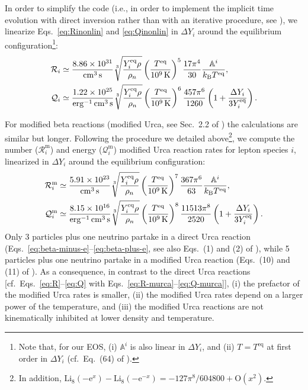 \documentclass[aps,prd,twocolumn,a4paper,floatfix,nofootbib,superscriptaddress,nofootinbib]{revtex4}
\newcommand{\req}{\mathrm{eq}}
\begin{document}
In order to simplify the code (i.e., in order to implement the implicit time evolution
with direct inversion rather than with an iterative procedure, see \citet{Camelio22code}), we linearize Eqs.~\eqref{eq:Rinonlin}
and \eqref{eq:Qinonlin} in $\Delta Y_i$ around the equilibrium configuration\footnote{Note that, for our EOS, (i) $\mathbb A^i$ is also
linear in $\Delta Y_i$, and (ii) $T=T^\req$ at first order in $\Delta Y_i$ (cf.~Eq.~(64) of \citet{Gavassino21bulk}).}:
%
\begin{align}
\label{eq:R}
\mathcal R_i\simeq{}& \frac{8.86\times 10^{31}}{\unit{cm^{3}\,s}}
\sqrt[3]{\frac{Y^\req_i\rho}{\rho_n}} \left(\frac{T^\req}{\unit[10^9]{K}}\right)^5
\frac{17\pi^4}{30}\frac{\mathbb A^i}{k_\mathrm{B}T^\req},\\
%
\label{eq:Q}
\mathcal Q_i\simeq{}& \frac{1.22\times10^{25}}{\unit{erg^{-1}\,cm^{3}\,s}}
\sqrt[3]{\frac{Y^\req_i\rho}{\rho_n}} \left(\frac{T^\req}{\unit[10^9]{K}}\right)^6\frac{457\pi^6}{1260}
\left(1 + \frac{\Delta Y_i}{3Y^\req_i}\right).
%
\end{align}

For modified beta reactions (modified Urca, see Sec.~2.2 of \citet{Haensel92}) the
calculations are similar but longer.
%
Following the procedure we detailed above\footnote{In addition,
$\mathrm{Li}_8(-\mathrm e^x)-\mathrm{Li}_8(-\mathrm e^{-x})=-{127\pi^8}/604800
+ \mathrm{O}(x^2)$.}, we compute the number ($\mathcal R_i^\mathrm{m}$) and energy
($\mathcal Q_i^\mathrm{m}$) modified Urca reaction rates for lepton species
$i$, linearized in $\Delta Y_i$ around the equilibrium configuration:
%
\begin{align}
\label{eq:R-murca}
\mathcal R_i^\mathrm{m}\simeq{}& \frac{5.91\times 10^{23}}{\unit{cm^{3}\,s}}
\sqrt[3]{\frac{Y^\req_i\rho}{\rho_n}}\left(\frac{T^\req}{\unit[10^9]{K}}\right)^7
\frac{367\pi^6}{63} \frac{\mathbb A^i}{k_\mathrm{B}T^\req},\\
%
\label{eq:Q-murca}
\mathcal Q_i^\mathrm{m}\simeq{}& \frac{8.15\times10^{16}}{\unit{erg^{-1}\,cm^{3}\,s}}
\sqrt[3]{\frac{Y^\req_i\rho}{\rho_n}} \left(\frac{T^\req}{\unit[10^9]{K}}\right)^8
\frac{11513\pi^8}{2520} \left(1 + \frac{\Delta Y_i}{3Y^\req_i}\right).
%
\end{align}
%
Only 3 particles plus one neutrino partake in a direct Urca reaction
(Eqs.~\eqref{eq:beta-minus-e}--\eqref{eq:beta-plus-e}, see also Eqs.~(1) and
(2) of \citet{Haensel92}), while 5 particles plus one neutrino partake in a
modified Urca reaction (Eqs.~(10) and (11) of \citet{Haensel92}).
%
As a consequence, in contrast to the direct Urca reactions
[cf.~Eqs.~\eqref{eq:R}--\eqref{eq:Q} with
Eqs.~\eqref{eq:R-murca}--\eqref{eq:Q-murca}], (i) the prefactor of the modified
Urca rates is smaller, (ii) the modified Urca rates depend on a larger power of
the temperature, and (iii) the modified Urca reactions are not kinematically
inhibited at lower density and temperature.
\end{document}
